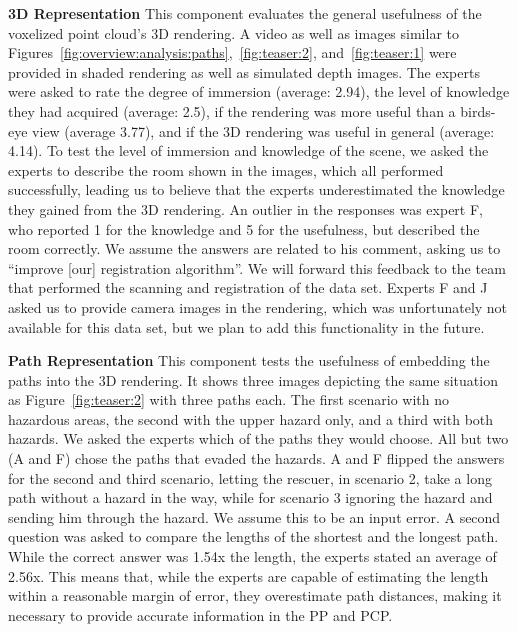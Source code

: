 \documentclass[review,journal]{vgtc}         %
\begin{document}
\noindent \textbf{3D Representation} This component evaluates the general usefulness of the voxelized point cloud's 3D rendering. A video as well as images similar to Figures~\ref{fig:overview:analysis:paths},~\ref{fig:teaser:2}, and~\ref{fig:teaser:1} were provided in shaded rendering as well as simulated depth images. The experts were asked to rate the degree of immersion (average: 2.94), the level of knowledge they had acquired (average: 2.5), if the rendering was more useful than a birds-eye view (average 3.77), and if the 3D rendering was useful in general (average: 4.14). To test the level of immersion and knowledge of the scene, we asked the experts to describe the room shown in the images, which all performed successfully, leading us to believe that the experts underestimated the knowledge they gained from the 3D rendering. An outlier in the responses was expert F, who reported 1 for the knowledge and 5 for the usefulness, but described the room correctly. We assume the answers are related to his comment, asking us to ``improve [our] registration algorithm''. We will forward this feedback to the team that performed the scanning and registration of the data set. Experts F and J asked us to provide camera images in the rendering, which was unfortunately not available for this data set, but we plan to add this functionality in the future.

\noindent \textbf{Path Representation} This component tests the usefulness of embedding the paths into the 3D rendering. It shows three images depicting the same situation as Figure~\ref{fig:teaser:2} with three paths each. The first scenario with no hazardous areas, the second with the upper hazard only, and a third with both hazards. We asked the experts which of the paths they would choose. All but two (A and F) chose the paths that evaded the hazards. A and F flipped the answers for the second and third scenario, letting the rescuer, in scenario 2, take a long path without a hazard in the way, while for scenario 3 ignoring the hazard and sending him through the hazard. We assume this to be an input error. A second question was asked to compare the lengths of the shortest and the longest path. While the correct answer was 1.54x the length, the experts stated an average of 2.56x. This means that, while the experts are capable of estimating the length within a reasonable margin of error, they overestimate path distances, making it necessary to provide accurate information in the PP and PCP.
\end{document}
